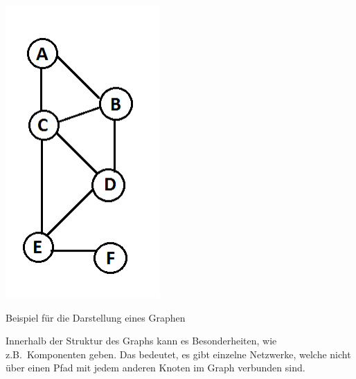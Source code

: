 \begin{dsafigure}
	\begin{center}
	\includegraphics[width=0.9\columnwidth]{img/graph1.png}
	\caption{Beispiel für die Darstellung eines Graphen \parencite[vgl.][]{Kleinberg-2009-oz}}
	\label{fig:graph1}
	\end{center}
\end{dsafigure}

Innerhalb der Struktur des Graphs kann es Besonderheiten, wie z.B.\ Komponenten geben.
Das bedeutet, es gibt einzelne Netzwerke, welche nicht über einen Pfad mit jedem anderen Knoten im Graph verbunden sind.

